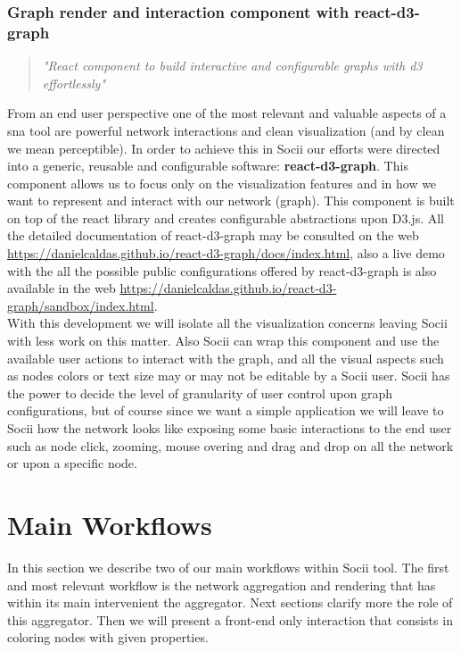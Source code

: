 \subsubsection{Graph render and interaction component with react-d3-graph}

\begin{quote}
\textit{"React component to build interactive and configurable graphs with d3 effortlessly"}
\end{quote}

From an end user perspective one of the most relevant and valuable aspects of a \gls{sna} tool are powerful network interactions and clean visualization (and by clean we mean perceptible). In order to achieve this in Socii our efforts were directed into a generic, reusable and configurable software: \textbf{react-d3-graph}\citep{reactd3graph}. This component allows us to focus only on the visualization features and in how we want to represent and interact with our network (graph). This component is built on top of the react library and creates configurable abstractions upon D3.js. All the detailed documentation of react-d3-graph
may be consulted on the web \citep{reactd3graph} \url{https://danielcaldas.github.io/react-d3-graph/docs/index.html}, also a live demo with the all the possible public configurations offered by react-d3-graph is also available in the web \url{https://danielcaldas.github.io/react-d3-graph/sandbox/index.html}.\\
With this development we will isolate all the visualization concerns leaving Socii with less work on this matter. Also Socii can wrap this component and use the available user actions to interact with the graph, and all the visual aspects such as nodes colors or text size may or may not be editable by a Socii user. Socii has the power to decide the level of granularity of user control upon graph configurations, but of course since we want a simple application we will leave to Socii how the network looks like exposing some basic interactions to the end user such as node click, zooming, mouse overing and drag and drop on all the network or upon a specific node.

\section{Main Workflows}

In this section we describe two of our main workflows within Socii tool. The first and most relevant workflow is the network aggregation and rendering that has within its main intervenient the aggregator. Next sections clarify more the role of this aggregator. Then we will present a front-end only interaction that consists in coloring nodes with given properties.

